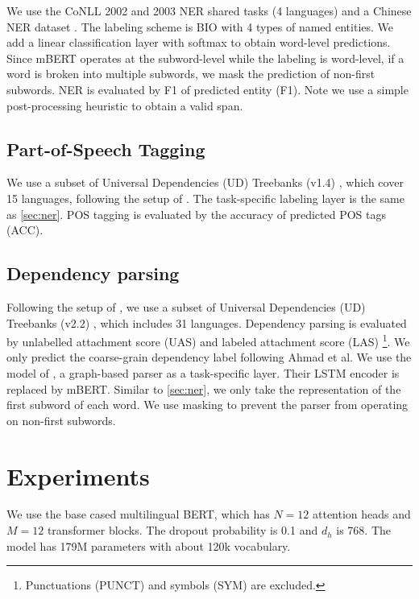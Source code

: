 \documentclass[11pt,a4paper]{article}
\begin{document}
We use the CoNLL 2002 and 2003 NER shared tasks \cite{tjong-kim-sang-2002-introduction,tjong-kim-sang-de-meulder-2003-introduction} (4 languages) and a Chinese NER dataset \cite{levow-2006-third}. The labeling scheme is BIO with 4 types of named entities. We add a linear classification layer with softmax to obtain word-level predictions. Since mBERT operates at the subword-level while the labeling is word-level, if a word is broken into multiple subwords, we mask the prediction of non-first subwords.
NER is evaluated by F1 of predicted entity (F1). Note we use a simple post-processing heuristic to obtain a valid span.

\subsection{Part-of-Speech Tagging}

We use a subset of Universal Dependencies (UD) Treebanks (v1.4) \cite{ud1.4}, which cover 15 languages, following the setup of . The task-specific labeling layer is the same as \cref{sec:ner}. POS tagging is evaluated by the accuracy of predicted POS tags (ACC).

\subsection{Dependency parsing}

Following the setup of , we use a subset of Universal Dependencies (UD) Treebanks (v2.2) \cite{ud2.2}, which includes 31 languages. Dependency parsing is evaluated by unlabelled attachment score (UAS) and labeled attachment score (LAS) \footnote{Punctuations (PUNCT) and symbols (SYM) are excluded.}. We only predict the coarse-grain dependency label following Ahmad et al. We use the model of , a graph-based parser as a task-specific layer. Their LSTM encoder is replaced by mBERT. Similar to \cref{sec:ner}, we only take the representation of the first subword of each word. We use masking to prevent the parser from operating on non-first subwords.


\section{Experiments}

We use the base cased multilingual BERT, which has $N=12$ attention heads and $M=12$ transformer blocks. The dropout probability is 0.1 and $d_h$ is 768. The model has 179M parameters with about 120k vocabulary.
\end{document}
